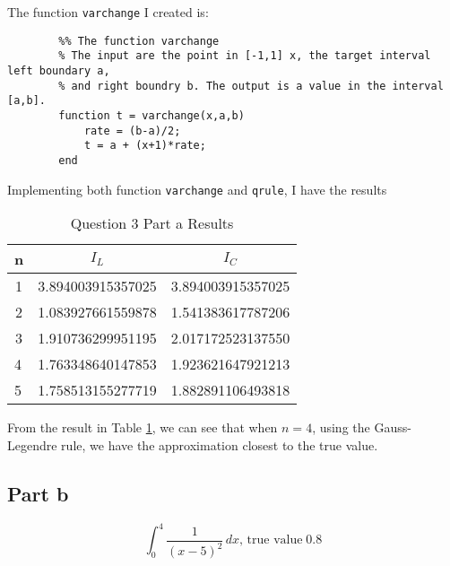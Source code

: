 \begin{answer}
    The function \verb+varchange+ I created is:
    \begin{verbatim}
        %% The function varchange
        % The input are the point in [-1,1] x, the target interval left boundary a,
        % and right boundry b. The output is a value in the interval [a,b].
        function t = varchange(x,a,b)
            rate = (b-a)/2;
            t = a + (x+1)*rate;
        end
    \end{verbatim}
    Implementing both function \verb+varchange+ and \verb+qrule+, I have the results
    \begin{table}[H]
    \centering
    \caption{Question 3 Part a Results}
    \label{tab:tab1}
    \begin{tabular}{|c|c|c|}
    \hline
    \textbf{n}              & \textbf{$I_L$}                            & \textbf{$I_C$}                            \\ \hline
    1                       & 3.894003915357025                      & 3.894003915357025                      \\ \hline
    2                       & 1.083927661559878                      & 1.541383617787206                      \\ \hline
    3                       & 1.910736299951195                      & 2.017172523137550                      \\ \hline
    \multicolumn{1}{|l|}{4} & \multicolumn{1}{l|}{1.763348640147853} & \multicolumn{1}{l|}{1.923621647921213} \\ \hline
    \multicolumn{1}{|l|}{5} & \multicolumn{1}{l|}{1.758513155277719} & \multicolumn{1}{l|}{1.882891106493818} \\ \hline
    \end{tabular}
    \end{table}
    From the result in Table \ref{tab:tab1}, we can see that when $n = 4$, using the Gauss-Legendre rule, we have the approximation closest to the true value.
\end{answer}

\subsection{Part b}

\begin{question}
    \begin{equation}
        \int_0^4 \frac{1}{(x-5)^2}\, dx\text{, true value}\; 0.8
    \end{equation}
\end{question}

